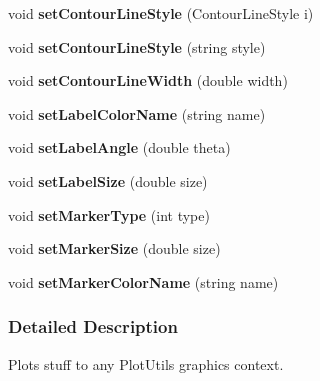 \begin{DoxyCompactItemize}
\item 
\hypertarget{classPlotMaker_a8d54078c82180263e11a3e01b8c107b5}{
void {\bfseries setContourLineStyle} (ContourLineStyle i)}
\label{classPlotMaker_a8d54078c82180263e11a3e01b8c107b5}

\item 
\hypertarget{classPlotMaker_af74e3b47a48ae889507344fb3bacae99}{
void {\bfseries setContourLineStyle} (string style)}
\label{classPlotMaker_af74e3b47a48ae889507344fb3bacae99}

\item 
\hypertarget{classPlotMaker_ac92f06122e096dcdfca991043ba86f88}{
void {\bfseries setContourLineWidth} (double width)}
\label{classPlotMaker_ac92f06122e096dcdfca991043ba86f88}

\item 
\hypertarget{classPlotMaker_a22b1936859ca0dc6d16f5fbdab85ae7e}{
void {\bfseries setLabelColorName} (string name)}
\label{classPlotMaker_a22b1936859ca0dc6d16f5fbdab85ae7e}

\item 
\hypertarget{classPlotMaker_af5d99fde6879bdf5895c96e371d08b9a}{
void {\bfseries setLabelAngle} (double theta)}
\label{classPlotMaker_af5d99fde6879bdf5895c96e371d08b9a}

\item 
\hypertarget{classPlotMaker_aee9b0f531899476e0cee2f0904dc1d24}{
void {\bfseries setLabelSize} (double size)}
\label{classPlotMaker_aee9b0f531899476e0cee2f0904dc1d24}

\item 
\hypertarget{classPlotMaker_a826826775cce241941fca3288c3a9a1b}{
void {\bfseries setMarkerType} (int type)}
\label{classPlotMaker_a826826775cce241941fca3288c3a9a1b}

\item 
\hypertarget{classPlotMaker_aefd113e385e3004f653b80043632ca9a}{
void {\bfseries setMarkerSize} (double size)}
\label{classPlotMaker_aefd113e385e3004f653b80043632ca9a}

\item 
\hypertarget{classPlotMaker_a75a64d353ee5b816c9381411fd263c0c}{
void {\bfseries setMarkerColorName} (string name)}
\label{classPlotMaker_a75a64d353ee5b816c9381411fd263c0c}

\end{DoxyCompactItemize}


\subsubsection{Detailed Description}
Plots stuff to any PlotUtils graphics context. 

